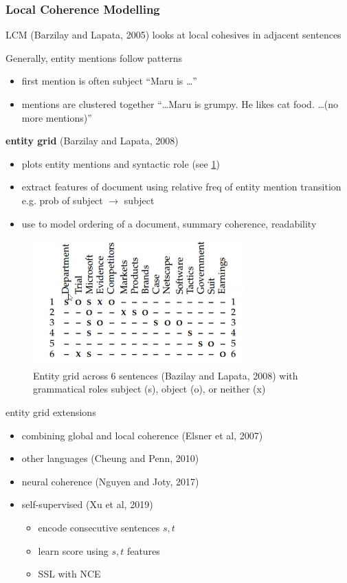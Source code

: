 \documentclass[]{article}
\theoremstyle{definition}
\begin{document}
\subsubsection{Local Coherence Modelling}%
\label{ssub:local_coherence_modelling}

LCM (Barzilay and Lapata, 2005) looks at local cohesives in adjacent sentences

Generally, entity mentions follow patterns
\begin{itemize}
    \item first mention is often subject ``Maru is \ldots''
    \item mentions are clustered together ``\ldots Maru is grumpy. He likes cat food. \ldots (no more mentions)''
\end{itemize}

\textbf{entity grid} (Barzilay and Lapata, 2008)
\begin{itemize}
    \item plots entity mentions and syntactic role (see \ref{fig:entity-grid})
    \item extract features of document using relative freq of entity mention transition e.g. prob of subject $\to$ subject
    \item use to model ordering of a document, summary coherence, readability
\end{itemize}

\begin{figure}[ht]
    \centering
    \includegraphics[width=0.5\linewidth]{comp550/entity-grid.png}
    \caption{Entity grid across 6 sentences (Bazilay and Lapata, 2008) with grammatical roles subject (s), object (o), or neither (x)}%
    \label{fig:entity-grid}
\end{figure}

entity grid extensions
\begin{itemize}
    \item combining global and local coherence (Elsner et al, 2007)
    \item other languages (Cheung and Penn, 2010)
    \item neural coherence (Nguyen and Joty, 2017)
    \item self-supervised (Xu et al, 2019)
        \begin{itemize}
            \item encode consecutive sentences $s, t$
            \item learn score using $s,t$ features
            \item SSL with NCE
        \end{itemize}
\end{itemize}
\end{document}
